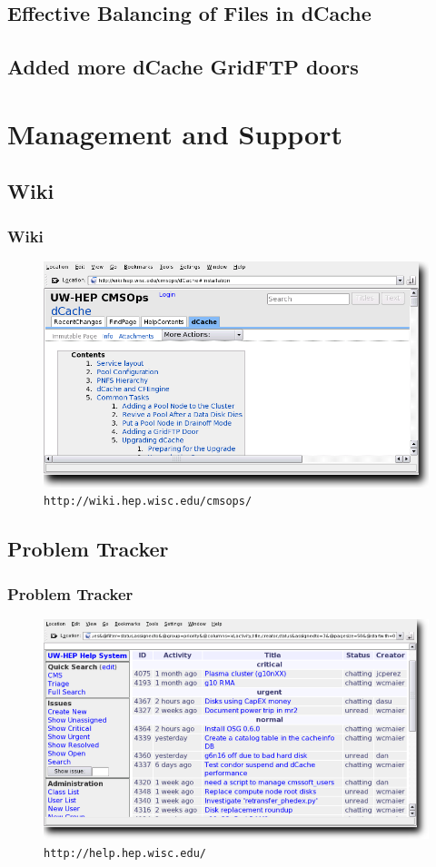 \documentclass{beamer}
\begin{document}
\subsection[dCache Load Balancing]{Effective Balancing of Files in dCache}
\subsection{Added more dCache GridFTP doors}

\section{Management and Support}
\subsection{Wiki}
\begin{frame}
\frametitle{Wiki}
\begin{figure}
    \includegraphics*{Graphics/wiki.png}
    \caption{{\tt http://wiki.hep.wisc.edu/cmsops/}}
\end{figure}
\end{frame}

\subsection{Problem Tracker}
\begin{frame}
\frametitle{Problem Tracker}
\begin{figure}
    \includegraphics*{Graphics/problem-tracker.png}
    \caption{{\tt http://help.hep.wisc.edu/}}
\end{figure}
\end{frame}
\end{document}

